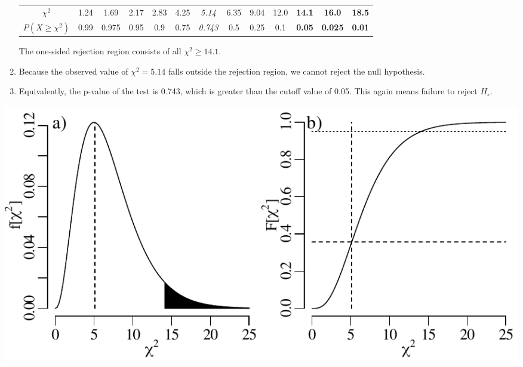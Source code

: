 \begin{enumerate}
  \begin{center}
    \begin{tabular}{c|c@{\gap}c@{\gap}c@{\gap}c@{\gap}
        c@{\gap}c@{\gap}c@{\gap}c@{\gap}c@{\gap}c@{\gap}c@{\gap}c}
      $\chi^2$ & 1.24 & 1.69 & 2.17 & 2.83 & 4.25 & \emph{5.14} &
      6.35 & 9.04 & 12.0 & \textbf{14.1} & \textbf{16.0} & \textbf{18.5} \\
      $P(X\geq{\chi^2})$ & 0.99 & 0.975 & 0.95 & 0.9 & 0.75 &
      \emph{0.743} & 0.5 & 0.25 & 0.1 & \textbf{0.05} &
      \textbf{0.025} & \textbf{0.01}
    \end{tabular}
  \end{center}

  The one-sided rejection region consists of all $\chi^2\geq{14.1}$. 

\item Because the observed value of $\chi^2=5.14$ falls outside the
  rejection region, we cannot reject the null hypothesis.

\item Equivalently, the p-value of the test is 0.743, which is greater
  than the cutoff value of 0.05.  This again means failure to reject
  $H_\circ$.
  
\end{enumerate}

\noindent\begin{minipage}[t][][b]{.6\textwidth}
  \includegraphics[width=\textwidth]{../figures/chi2.pdf}\\
\end{minipage}
\begin{minipage}[t][][t]{.4\textwidth}
  \label{fig:chi2}
\end{minipage}

